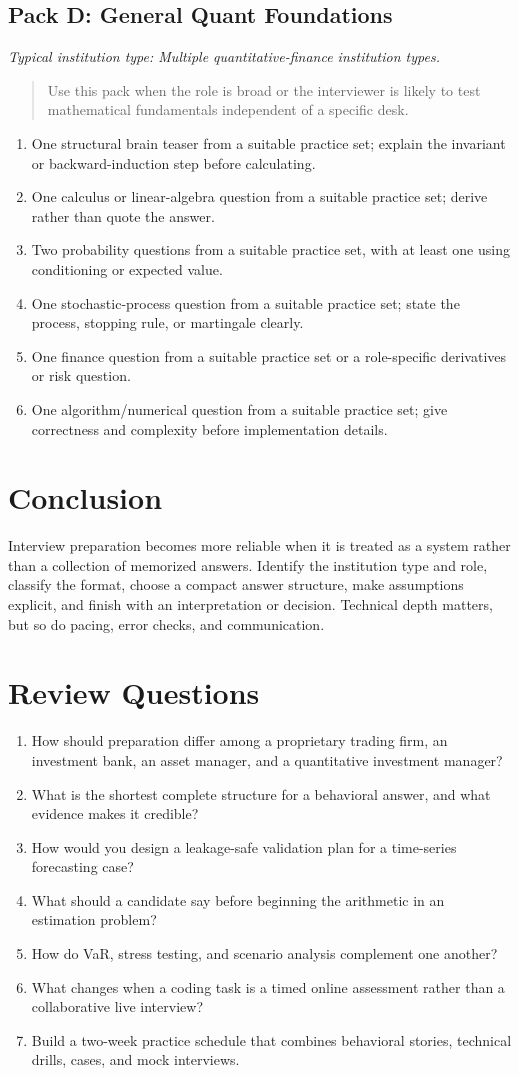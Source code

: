 \documentclass[11pt,letterpaper,openany]{book}
\newcommand{\RoleProfile}[2]{%
  \subsection{#1}%
  \noindent\textit{Typical institution type: #2.}\par
}
\newcommand{\playbooknote}[1]{\begin{quote}\small #1\end{quote}}
\begin{document}
\RoleProfile{Pack D: General Quant Foundations}{Multiple quantitative-finance institution types}
\playbooknote{Use this pack when the role is broad or the interviewer is likely to test mathematical fundamentals independent of a specific desk.}
\begin{enumerate}
  \item One structural brain teaser from a suitable practice set; explain the invariant or backward-induction step before calculating.
  \item One calculus or linear-algebra question from a suitable practice set; derive rather than quote the answer.
  \item Two probability questions from a suitable practice set, with at least one using conditioning or expected value.
  \item One stochastic-process question from a suitable practice set; state the process, stopping rule, or martingale clearly.
  \item One finance question from a suitable practice set or a role-specific derivatives or risk question.
  \item One algorithm/numerical question from a suitable practice set; give correctness and complexity before implementation details.
\end{enumerate}
\section{Conclusion}
Interview preparation becomes more reliable when it is treated as a system rather than a collection of memorized answers. Identify the institution type and role, classify the format, choose a compact answer structure, make assumptions explicit, and finish with an interpretation or decision. Technical depth matters, but so do pacing, error checks, and communication.

\section{Review Questions}
\begin{enumerate}
  \item How should preparation differ among a proprietary trading firm, an investment bank, an asset manager, and a quantitative investment manager?
  \item What is the shortest complete structure for a behavioral answer, and what evidence makes it credible?
  \item How would you design a leakage-safe validation plan for a time-series forecasting case?
  \item What should a candidate say before beginning the arithmetic in an estimation problem?
  \item How do VaR, stress testing, and scenario analysis complement one another?
  \item What changes when a coding task is a timed online assessment rather than a collaborative live interview?
  \item Build a two-week practice schedule that combines behavioral stories, technical drills, cases, and mock interviews.
\end{enumerate}
\end{document}
